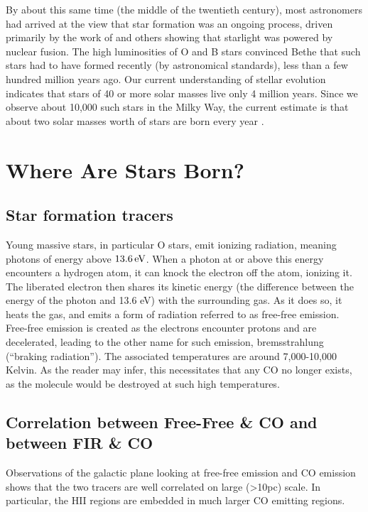 \documentclass[../dissertation.tex]{subfiles}
\begin{document}
By about this same time (the middle of the twentieth century), most astronomers had arrived at the view that star formation was an ongoing process, 
driven primarily by the work of \citet{1939PhRv...55..434B}
and others showing that starlight was powered by nuclear fusion. 
The high luminosities of O and B stars convinced Bethe that such stars had to have formed recently (by astronomical standards), less than a few hundred million years ago. 
Our current understanding of stellar evolution indicates that stars of 40 or more solar masses live only 4 million years. 
Since we observe about 10,000 such stars in the Milky Way, the current estimate is that about two solar masses worth of stars are born every year \citep{2011AJ....142..197C}. 


\section{Where Are Stars Born?}

\subsection{Star formation tracers}

Young massive stars, in particular O stars, emit ionizing radiation, meaning photons of energy above $13.6 \,{\rm eV}$. 
When a photon at or above this energy encounters a hydrogen atom, it can knock the electron off the atom, ionizing it. 
The liberated electron then shares its kinetic energy (the difference between the energy of the photon and 13.6 eV) with the surrounding gas. 
As it does so, it heats the gas, and emits a form of radiation referred to as free-free emission. 
Free-free emission is created as the electrons encounter protons and are decelerated, leading to the other name for such emission, bremsstrahlung (``braking radiation''). 
The associated temperatures are around 7,000-10,000 Kelvin. 
As the reader may infer, this necessitates that any CO no longer exists, as the molecule would be destroyed at such high temperatures.

\subsection{Correlation between Free-Free \& CO and between FIR \& CO}

Observations of the galactic plane looking at free-free emission and CO emission shows that the two tracers are well correlated on large (>10pc) scale. In particular, the HII regions are embedded in much larger CO emitting regions. 
\end{document}
